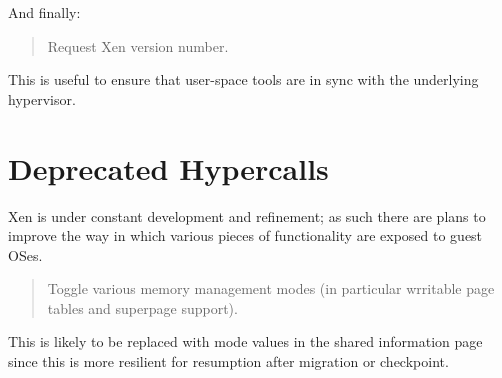 \documentclass[11pt,twoside,final,openright]{report}
\begin{document}
And finally: 
\begin{quote}

Request Xen version number.
\end{quote} 

This is useful to ensure that user-space tools are in sync 
with the underlying hypervisor. 

\section{Deprecated Hypercalls}

Xen is under constant development and refinement; as such there 
are plans to improve the way in which various pieces of functionality 
are exposed to guest OSes. 

\begin{quote} 

Toggle various memory management modes (in particular wrritable page
tables and superpage support). 

\end{quote} 

This is likely to be replaced with mode values in the shared 
information page since this is more resilient for resumption 
after migration or checkpoint. 








\end{document}
